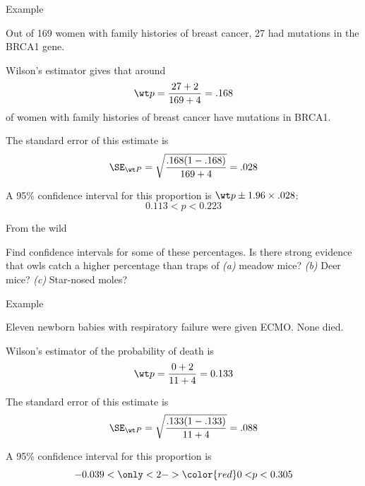 \begin{frame}{Example}

    Out of 169 women with family histories of breast cancer, 27 had mutations in the BRCA1 gene.

    \vspace{2em}

    \alert{Wilson's estimator} gives that around
        \[ \wt p = \frac{27 + 2}{169+4} = .168 \]
    of women with family histories of breast cancer have mutations in BRCA1.

    \vspace{2em}

    The \alert{standard error} of this estimate is
    \[ \SE_{\wt P} = \sqrt{\frac{.168(1-.168)}{169+4}} = .028  \]

    \vspace{2em}

    A \alert{95\% confidence interval} for this proportion is $\wt p \pm 1.96 \times .028$:
    \[ 0.113 < p < 0.223 \]

\end{frame}

\begin{frame}{From the wild}

    \begin{center}
    \end{center}

    \vspace{2em}

    Find confidence intervals for some of these percentages.  
    Is there strong evidence that owls catch a higher percentage than traps of 
    \textit{(a)} meadow mice?
    \textit{(b)} Deer mice?
    \textit{(c)} Star-nosed moles?


\end{frame}

\begin{frame}{Example}

    Eleven newborn babies with respiratory failure were given ECMO.  None died.

    \vspace{2em}

    \alert{Wilson's estimator} of the probability of death is
    \[ \wt p = \frac{0+2}{11+4} = 0.133 \]

    \vspace{2em}

    The \alert{standard error} of this estimate is
    \[ \SE_{\wt P} = \sqrt{\frac{ .133(1-.133) }{ 11+4 }} = .088 \]

    \vspace{2em}

    A \alert{95\% confidence interval} for this proportion is
    \[ -0.039 < \only<2->{ {\color{red} 0 <}} p < 0.305 \]


\end{frame}

